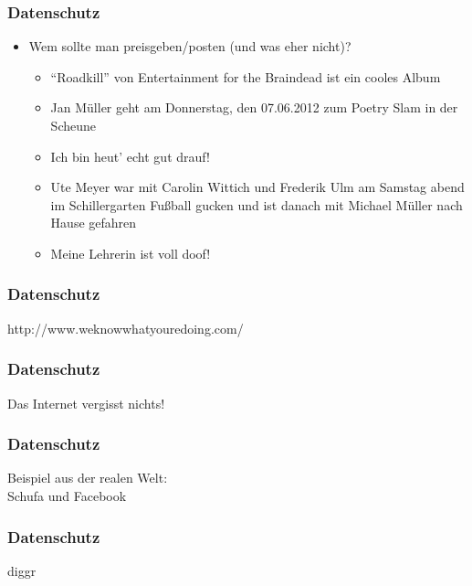 \documentclass[12pt]{beamer}
\begin{document}
\begin{frame}
  \frametitle{Datenschutz}

  \begin{itemize}
    \item Wem sollte man preisgeben/posten (und was eher nicht)?
      \begin{itemize}
        \item<2-> "`Roadkill"' von Entertainment for the Braindead ist ein cooles Album
        \item<3-> Jan Müller geht am Donnerstag, den 07.06.2012 zum Poetry Slam in der Scheune
        \item<4-> Ich bin heut' echt gut drauf!
        \item<5-> Ute Meyer war mit Carolin Wittich und Frederik Ulm am Samstag abend im Schillergarten Fußball gucken und ist danach mit Michael Müller nach Hause gefahren
        \item<6-> Meine Lehrerin ist voll doof!
      \end{itemize}
  \end{itemize}
\end{frame}

\begin{frame}
  \frametitle{Datenschutz}

  \begin{center} \Large
   http://www.weknowwhatyouredoing.com/
  \end{center}
\end{frame}

\begin{frame}
  \frametitle{Datenschutz}

  \begin{center} \Large
   Das Internet vergisst nichts!
  \end{center}
\end{frame}

\begin{frame}
  \frametitle{Datenschutz}

  \begin{center} \Large
   Beispiel aus der realen Welt:\\ Schufa und Facebook
  \end{center}
\end{frame}

\begin{frame}
  \frametitle{Datenschutz}

  \begin{center} \Large
   diggr
  \end{center}
\end{frame}
\end{document}
